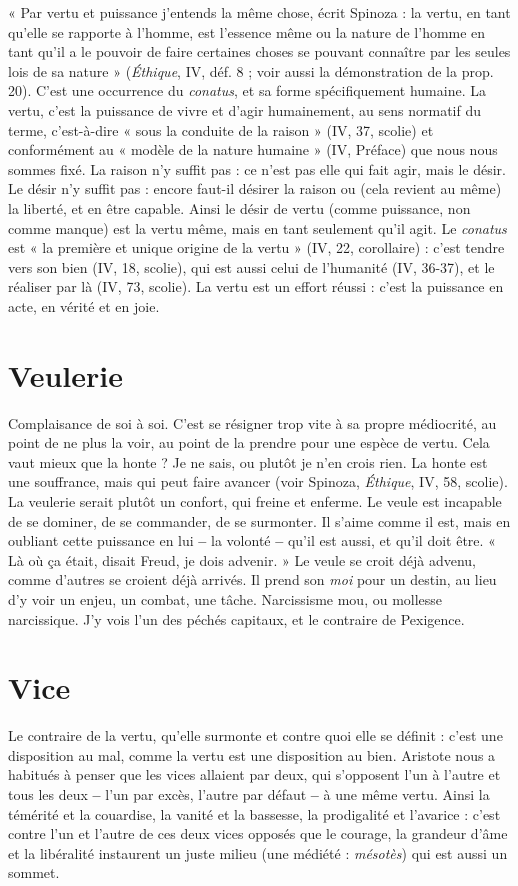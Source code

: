 « Par vertu et puissance j'entends la même chose, écrit Spinoza : la vertu, en
tant qu’elle se rapporte à l’homme, est l’essence même ou la nature de l’homme
en tant qu’il a le pouvoir de faire certaines choses se pouvant connaître par les
seules lois de sa nature » ({\it Éthique}, IV, déf. 8 ; voir aussi la démonstration de la
prop. 20). C’est une occurrence du {\it conatus}, et sa forme spécifiquement
humaine. La vertu, c’est la puissance de vivre et d’agir humainement, au sens
normatif du terme, c’est-à-dire « sous la conduite de la raison » (IV, 37, scolie)
et conformément au « modèle de la nature humaine » (IV, Préface) que nous
nous sommes fixé. La raison n’y suffit pas : ce n’est pas elle qui fait agir, mais
le désir. Le désir n'y suffit pas : encore faut-il désirer la raison ou (cela revient
au même) la liberté, et en être capable. Ainsi le désir de vertu (comme puissance,
non comme manque) est la vertu même, mais en tant seulement qu’il
agit. Le {\it conatus} est « la première et unique origine de la vertu » (IV, 22,
corollaire) : c’est tendre vers son bien (IV, 18, scolie), qui est aussi celui de
l'humanité (IV, 36-37), et le réaliser par là (IV, 73, scolie). La vertu est un
effort réussi : c’est la puissance en acte, en vérité et en joie.

\section{Veulerie}
Complaisance de soi à soi. C’est se résigner trop vite à sa propre
médiocrité, au point de ne plus la voir, au point de la prendre
pour une espèce de vertu. Cela vaut mieux que la honte ? Je ne sais, ou plutôt
je n’en crois rien. La honte est une souffrance, mais qui peut faire avancer (voir
Spinoza, {\it Éthique}, IV, 58, scolie). La veulerie serait plutôt un confort, qui freine
et enferme. Le veule est incapable de se dominer, de se commander, de se surmonter.
Il s'aime comme il est, mais en oubliant cette puissance en lui {\bf --} la
volonté {\bf --} qu’il est aussi, et qu’il doit être. « Là où ça était, disait Freud, je dois
advenir. » Le veule se croit déjà advenu, comme d’autres se croient déjà arrivés.
Il prend son {\it moi} pour un destin, au lieu d’y voir un enjeu, un combat, une
tâche. Narcissisme mou, ou mollesse narcissique. J’y vois l’un des péchés capitaux,
et le contraire de Pexigence.

\section{Vice}
Le contraire de la vertu, qu’elle surmonte et contre quoi elle se définit :
c’est une disposition au mal, comme la vertu est une disposition
au bien.
Aristote nous a habitués à penser que les vices allaient par deux, qui s’opposent
l'un à l’autre et tous les deux {\bf --} l’un par excès, l’autre par défaut {\bf --} à une
même vertu. Ainsi la témérité et la couardise, la vanité et la bassesse, la prodigalité
et l’avarice : c’est contre l’un et l’autre de ces deux vices opposés que le
courage, la grandeur d’âme et la libéralité instaurent un juste milieu (une
médiété : {\it mésotès}) qui est aussi un sommet.

